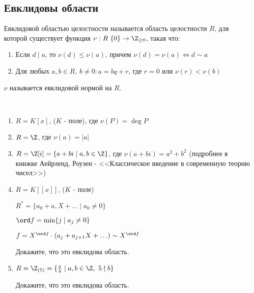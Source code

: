 \subsection{Евклидовы области}

\begin{defn}
    Евклидовой областью целостности называется область целостности $R$, для которой существует функция $\nu: R \ \{0\} \to \Z_{\geq 0}$, такая что:

    \begin{enumerate}
        \item Если $d \mid a$, то $\nu(d) \leq \nu(a)$, причем $\nu(d) = \nu(a) \iff d \sim a$
        
        \item Для любых $a, b \in R,~b \neq 0: a = bq + r$, где $r = 0$ или $\nu(r) < \nu(b)$ 
    \end{enumerate}
\end{defn}

\begin{defn} 
    $\nu$ называется евклидовой нормой на $R$.
\end{defn}

\begin{examples}~

    \begin{enumerate}
        \item $R = K[x]$, ($K$ - поле), где $\nu(P) = \deg P$

        \item $R = \Z$, где $\nu(a) = |a|$
        
        \item $R = \Z[i] = \{ a + bi \mid a,b \in \Z \}$, где $\nu(a + bi) = a^2 + b^2$ (подробнее в книжке Аейрленд, Роузен - <<Классическое введение в современную теорию чисел>>)
        
        \item $R = K[[x]]$, ($K$ - поле) 
        
        $R^* = \{ a_0 + a, X + \ldots \mid a_0 \neq 0 \}$

        $\ord f =  \min \{ j \mid a_j \neq 0 \}$

        $f = X^{\ord f} \cdot (a_j + a_{j + 1}X + \ldots) \sim X^{\ord f}$ 

        \begin{exerc}
            Докажите, что это евклидова область.
        \end{exerc}

        \item $R = \Z_{(5)} = \{ \frac{a}{b} \mid a, b \in \Z,~5 \nmid b \}$
        
        \begin{exerc}
            Докажите, что это евклидова область.
        \end{exerc}
    \end{enumerate}
\end{examples}

